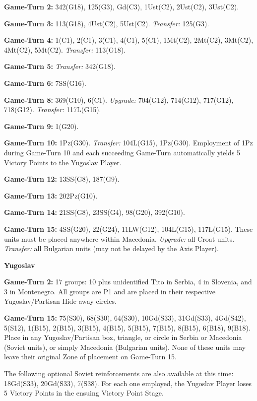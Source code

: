 \textbf{Game-Turn 2:} 342(G18), 125(G3), Gd(C3), 1Ust(C2), 2Ust(C2), 3Ust(C2).

\textbf{Game-Turn 3:} 113(G18), 4Ust(C2), 5Ust(C2). \emph{Transfer:} 125(G3).

\textbf{Game-Turn 4:} 1(C1), 2(C1), 3(C1), 4(C1), 5(C1), 1Mt(C2), 2Mt(C2),
3Mt(C2), 4Mt(C2), 5Mt(C2). \emph{Transfer:} 113(G18).

\textbf{Game-Turn 5:} \emph{Transfer:} 342(G18).

\textbf{Game-Turn 6:} 7SS(G16).

\textbf{Game-Turn 8:} 369(G10), 6(C1). \emph{Upgrade:} 704(G12), 714(G12),
717(G12), 718(G12). \emph{Transfer:} 117L(G15).

\textbf{Game-Turn 9:} 1(G20).

\textbf{Game-Turn 10:} 1Pz(G30). \emph{Transfer:} 104L(G15), 1Pz(G30).
Employment of 1Pz during Game-Turn 10 and each succeeding Game-Turn
automatically yields 5 Victory Points to the Yugoslav Player.

\textbf{Game-Turn 12:} 13SS(G8), 187(G9).

\textbf{Game-Turn 13:} 202Pz(G10).

\textbf{Game-Turn 14:} 21SS(G8), 23SS(G4), 98(G20), 392(G10).

\textbf{Game-Turn 15:} 4SS(G20), 22(G24), 11LW(G12), 104L(G15), 117L(G15).
These units must be placed anywhere within Macedonia. \emph{Upgrade:} all Croat
units. \emph{Transfer:} all Bulgarian units (may not be delayed by the Axis
Player).

 \textbf{Yugoslav}

\textbf{Game-Turn 2:} 17 groups: 10 plus unidentified Tito in Serbia, 4 in
Slovenia, and 3 in Montenegro. All groups are P1 and are placed in their
respective Yugoslav/Partisan Hide-away circles.

\textbf{Game-Turn 15:} 75(S30), 68(S30), 64(S30), 10Gd(S33), 31Gd(S33),
4Gd(S42), 5(S12), 1(B15), 2(B15), 3(B15), 4(B15), 5(B15), 7(B15), 8(B15),
6(B18), 9(B18). Place in any Yugoslav/Partisan box, triangle, or circle in
Serbia or Macedonia (Soviet units), or simply Macedonia (Bulgarian units).
None of these units may leave their original Zone of placement on Game-Turn 15.

The following optional Soviet reinforcements are also available at this time:
18Gd(S33), 20Gd(S33), 7(S38). For each one employed, the Yugoslav Player loses
5 Victory Points in the ensuing Victory Point Stage.
